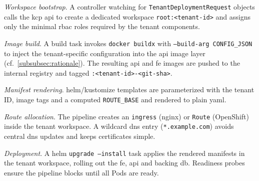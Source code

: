 \documentclass[11pt, a4paper, oneside, listof=totoc]{scrartcl}
\begin{document}
                \begin{enumerate}[label={[\arabic*]:},
                    ref=Challenge~\arabic*,
                    leftmargin=*,
                    itemsep=0.6\baselineskip]

                    \item\label{chal:bootstrap}
                        \textit{Workspace bootstrap}.  
                        A controller watching for \texttt{TenantDeploymentRequest} objects
                        calls the \gls{kcp} \gls{api} to create a dedicated workspace
                        \texttt{root:\textless{}tenant-id\textgreater{}} and assigns only the
                        minimal \gls{rbac} roles required by the tenant components.

                    \item\label{chal:imageBuild}
                        \textit{Image build}.
                        A build task invokes \texttt{docker buildx} with
                        \texttt{--build-arg CONFIG\_JSON} to inject the tenant-specific
                        configuration into the \gls{api} image layer
                        (cf.~\autoref{subsubsec:rationale}).  
                        The resulting \gls{api} and \gls{fe} images are pushed to the internal
                        registry and tagged
                        \texttt{:\textless{}tenant-id\textgreater{}-\textless{}git-sha\textgreater{}}.

                    \item\label{chal:manifestRendering}
                        \textit{Manifest rendering}.
                        \gls{helm}/\gls{kustomize} templates are parameterized with the tenant ID, image
                        tags and a computed \texttt{ROUTE\_BASE} and rendered to plain \gls{yaml}.

                    \item\label{chal:routeAllocation}
                        \textit{Route allocation}.
                        The pipeline creates an \texttt{\gls{ingress}} (nginx) or \texttt{Route}
                        (OpenShift) inside the tenant workspace.
                        A wildcard \gls{dns} entry (\texttt{*.example.com}) avoids central \gls{dns}
                        updates and keeps certificates simple.

                    \item\label{chal:applyManifests}
                        \textit{Deployment}.  
                        A \gls{helm} \texttt{upgrade --install} task applies the rendered manifests
                        in the tenant workspace, rolling out the \gls{fe}, \gls{api} and
                        backing \gls{db}.  
                        Readiness probes ensure the pipeline blocks until all Pods are ready.


\end{enumerate}
\end{document}
